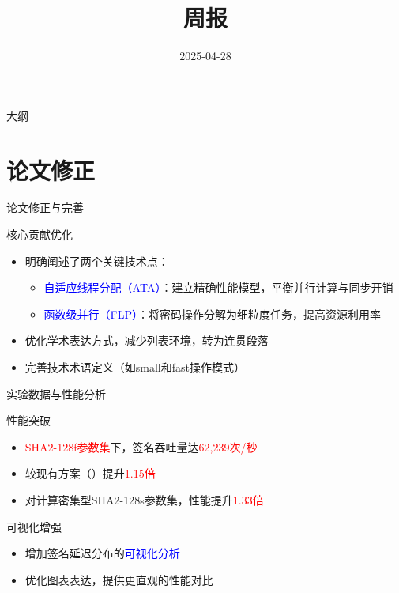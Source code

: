 \documentclass{beamer}
\title{\LARGE{周报}}
\subtitle{}
\author{}
\date{2025-04-28}
\begin{document}
\begin{frame}
  \titlepage
\end{frame}

\begin{frame}{大纲}
  \tableofcontents
\end{frame}

\section{论文修正}
\begin{frame}{论文修正与完善}
  \begin{block}{核心贡献优化}
    \begin{itemize}
      \item 明确阐述了两个关键技术点：
        \begin{itemize}
          \item \textcolor{blue}{自适应线程分配（ATA）}：建立精确性能模型，平衡并行计算与同步开销
          \item \textcolor{blue}{函数级并行（FLP）}：将密码操作分解为细粒度任务，提高资源利用率
        \end{itemize}
      \item 优化学术表达方式，减少列表环境，转为连贯段落
      \item 完善技术术语定义（如small和fast操作模式）
    \end{itemize}
  \end{block}
\end{frame}

\begin{frame}{实验数据与性能分析}
  \begin{block}{性能突破}
    \begin{itemize}
      \item \textcolor{red}{SHA2-128f参数集}下，签名吞吐量达\textcolor{red}{62,239次/秒}
      \item 较现有方案（\cite{Wang2025}）提升\textcolor{red}{1.15倍}
      \item 对计算密集型SHA2-128s参数集，性能提升\textcolor{red}{1.33倍}
    \end{itemize}
  \end{block}
  \begin{block}{可视化增强}
    \begin{itemize}
      \item 增加签名延迟分布的\textcolor{blue}{可视化分析}
      \item 优化图表表达，提供更直观的性能对比
    \end{itemize}
  \end{block}
\end{frame}
\end{document}

